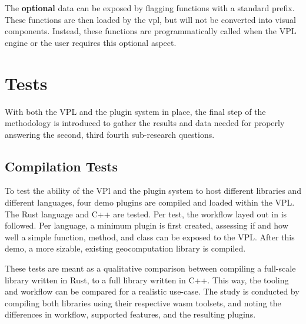 The \textbf{optional} data can be exposed by flagging functions with a standard prefix.
These functions are then loaded by the vpl, but will not be converted into visual components. 
Instead, these functions are programmatically called when the VPL engine or the user requires this optional aspect. 






\section{Tests}
\label{sec:method:tests}
With both the VPL and the plugin system in place, the final step of the methodology is introduced to gather the results and data needed for properly answering the second, third fourth sub-research questions.


\subsection{Compilation Tests}
\label{sec:method:tests:compilation}

To test the ability of the VPl and the plugin system to host different libraries and different languages, four demo plugins are compiled and loaded within the VPL.  
The Rust language and C++ are tested. 
Per test, the workflow layed out in  is followed. 
Per language, a minimum plugin is first created, assessing if and how well a simple function, method, and class can be exposed to the VPL.
After this demo, a more sizable, existing geocomputation library is compiled.

These tests are meant as a qualitative comparison between compiling a full-scale library written in Rust, to a full library written in C++. 
This way, the tooling and workflow can be compared for a realistic use-case. 
The study is conducted by compiling both libraries using their respective \ac{wasm} toolsets, and noting the differences in workflow, supported features, and the resulting plugins. 


